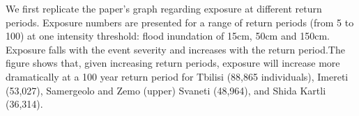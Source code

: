 \documentclass[
  letterpaper,
  DIV=11,
  numbers=noendperiod]{scrartcl}
\newenvironment{Shaded}{}{}
\newcommand{\AttributeTok}[1]{\textcolor[rgb]{0.84,0.23,0.29}{#1}}
\newcommand{\FunctionTok}[1]{\textcolor[rgb]{0.44,0.26,0.76}{#1}}
\newcommand{\NormalTok}[1]{\textcolor[rgb]{0.14,0.16,0.18}{#1}}
\newcommand{\OtherTok}[1]{\textcolor[rgb]{0.44,0.26,0.76}{#1}}
\newcommand{\SpecialCharTok}[1]{\textcolor[rgb]{0.00,0.36,0.77}{#1}}
\begin{document}
We first replicate the paper's graph regarding exposure at different
return periods. Exposure numbers are presented for a range of return
periods (from 5 to 100) at one intensity threshold: flood inundation of
15cm, 50cm and 150cm. Exposure falls with the event severity and
increases with the return period.The figure shows that, given increasing
return periods, exposure will increase more dramatically at a 100 year
return period for Tbilisi (88,865 individuals), Imereti (53,027),
Samergeolo and Zemo (upper) Svaneti (48,964), and Shida Kartli (36,314).

\begin{Shaded}
\end{Shaded}
\end{document}
